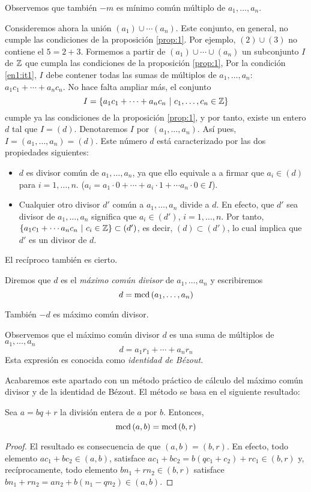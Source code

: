 Observemos que también $-m$ es mínimo común múltiplo de $a_1,\dots,a_n$.

Consideremos ahora la unión $(a_1)\cup\cdots(a_n)$. Este conjunto, en general, no cumple las condiciones de la proposición \ref{prop:1}. Por ejemplo, $(2)\cup (3)$ no contiene el $5=2+3$. Formemos a partir de $(a_1)\cup\cdots\cup (a_n)$ un subconjunto $I$ de $\mathbb{Z}$ que cumpla las condiciones de la proposición \ref{prop:1}, Por la condición \ref{en1:it1}, $I$ debe contener todas las sumas de múltiplos de $a_1,\dots,a_n$: $a_1c_1+\cdots+a_nc_n$. No hace falta ampliar más, el conjunto
$$I=\set{a_1c_1 + \cdots + a_nc_n \ | \ c_1,\dots,c_n\in\ZZ }$$
cumple ya las condiciones de la proposición \ref{prop:1}, y por tanto, existe un entero $d$ tal que $I=(d)$. Denotaremos $I$ por $(a_1,\dots,a_n)$. Así pues, $I=(a_1,\dots,a_n)=(d)$. Este número $d$ está caracterizado por las dos propiedades siguientes:
\begin{itemize}
    \item $d$ es divisor común de $a_1,\dots,a_n$, ya que ello equivale a a firmar que $a_i\in (d)$ para $i=1,\dots,n$. ($a_i=a_1\cdot 0 + \cdots + a_i\cdot 1 + \cdots a_n\cdot 0 \in I$).
    \item Cualquier otro divisor $d'$ común a $a_1,\dots,a_n$ divide a $d$. En efecto, que $d'$ sea divisor de $a_1,\dots,a_n$ significa que $a_i\in (d')$, $i=1,\dots,n$. Por tanto, $\set{a_1c_1+\cdots a_nc_n \ | \ c_i\in\ZZ}\subset (d')$, es decir, $(d)\subset (d')$, lo cual implica que $d'$ es un divisor de $d$.
\end{itemize}
El recíproco también es cierto.

Diremos que $d$ es el {\it máximo común divisor} de $a_1,\dots,a_n$ y escribiremos
$$d=\operatorname{\rm mcd}\left(a_1,\dots,a_n\right)$$

También $-d$ es máximo común divisor.

Observemos que el máximo común divisor $d$ es una suma de múltiplos de $a_1,\dots,a_n$
$$d=a_1r_1+\cdots+a_nr_n$$
Esta expresión es conocida como {\it identidad de Bézout}.

Acabaremos este apartado con un método práctico de cálculo del máximo común divisor y de la identidad de Bézout. El método se basa en el siguiente resultado:

\begin{prop}
    Sea $a=bq+r$ la división entera de $a$ por $b$. Entonces,
    $$\operatorname{\rm mcd}\left(a,b\right)=\operatorname{\rm mcd}\left(b,r\right)$$
\end{prop}

\begin{proof}
    El resultado es consecuencia de que $(a,b)=(b,r)$. En efecto, todo elemento $ac_1+bc_2\in (a,b)$, satisface $ac_1+bc_2=b(qc_1+c_2)+rc_1\in (b,r)$ y, recíprocamente, todo elemento $bn_1+rn_2\in(b,r)$ satisface $bn_1+rn_2=an_2+b(n_1-qn_2)\in (a,b)$.
\end{proof}


